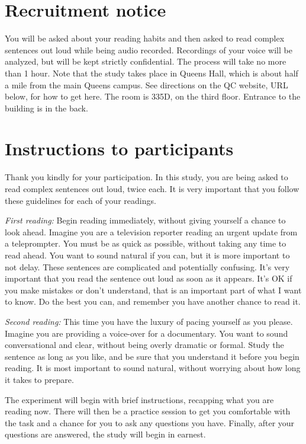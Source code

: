 \documentclass[12pt,oneside]{book}
\begin{document}
\newpage

\hypertarget{rec}{%
\chapter{Recruitment notice}\label{rec}}

You will be asked about your reading habits and then asked to read complex sentences out loud while being audio recorded. Recordings of your voice will be analyzed, but will be kept strictly confidential. The process will take no more than 1 hour. Note that the study takes place in Queens Hall, which is about half a mile from the main Queens campus. See directions on the QC website, URL below, for how to get here. The room is 335D, on the third floor. Entrance to the building is in the back.

\newpage

\hypertarget{instr}{%
\chapter{Instructions to participants}\label{instr}}

Thank you kindly for your participation. In this study, you are being asked to read complex sentences out loud, twice each. It is very important that you follow these guidelines for each of your readings.

\emph{First reading:} Begin reading immediately, without giving yourself a chance to look ahead. Imagine you are a television reporter reading an urgent update from a teleprompter. You must be as quick as possible, without taking any time to read ahead. You want to sound natural if you can, but it is more important to not delay. These sentences are complicated and potentially confusing. It's very important that you read the sentence out loud as soon as it appears. It's OK if you make mistakes or don't understand, that is an important part of what I want to know. Do the best you can, and remember you have another chance to read it.

\emph{Second reading:} This time you have the luxury of pacing yourself as you please. Imagine you are providing a voice-over for a documentary. You want to sound conversational and clear, without being overly dramatic or formal. Study the sentence as long as you like, and be sure that you understand it before you begin reading. It is most important to sound natural, without worrying about how long it takes to prepare.

The experiment will begin with brief instructions, recapping what you are reading now. There will then be a practice session to get you comfortable with the task and a chance for you to ask any questions you have. Finally, after your questions are answered, the study will begin in earnest.
\end{document}
